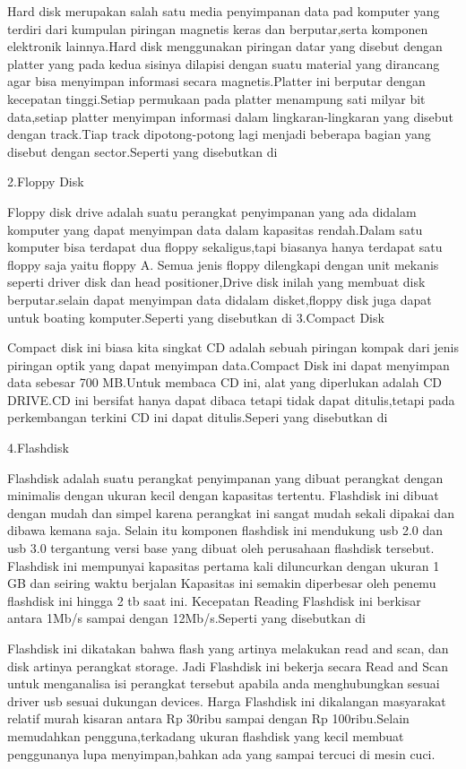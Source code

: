 Hard disk merupakan salah satu media penyimpanan data pad komputer yang terdiri dari kumpulan piringan magnetis keras dan berputar,serta komponen elektronik lainnya.Hard disk menggunakan piringan datar yang disebut dengan platter yang pada kedua sisinya dilapisi dengan suatu material yang dirancang agar bisa menyimpan informasi secara magnetis.Platter ini berputar dengan kecepatan tinggi.Setiap permukaan pada platter menampung sati milyar bit data,setiap platter menyimpan informasi dalam lingkaran-lingkaran yang disebut dengan track.Tiap track dipotong-potong lagi menjadi beberapa bagian yang disebut dengan sector.Seperti yang disebutkan di \cite{wahyudi2005mengenal}

2.Floppy Disk

Floppy disk drive adalah suatu perangkat penyimpanan yang ada didalam komputer yang dapat menyimpan data dalam kapasitas rendah.Dalam satu komputer bisa terdapat dua floppy sekaligus,tapi biasanya hanya terdapat satu floppy saja yaitu floppy A. Semua jenis floppy dilengkapi dengan unit mekanis seperti driver disk dan head positioner,Drive disk inilah yang membuat disk berputar.selain dapat menyimpan data didalam disket,floppy disk juga dapat untuk boating komputer.Seperti yang disebutkan di \cite{horie1987floppy}
3.Compact Disk

Compact disk ini biasa kita singkat CD adalah sebuah piringan kompak dari jenis piringan optik yang dapat menyimpan data.Compact Disk ini dapat menyimpan data sebesar 700 MB.Untuk membaca CD ini, alat yang diperlukan adalah CD DRIVE.CD ini bersifat hanya dapat dibaca tetapi tidak dapat ditulis,tetapi pada perkembangan terkini CD ini dapat ditulis.Seperi yang disebutkan di \cite{ernst1998turtles}

4.Flashdisk

Flashdisk adalah suatu perangkat penyimpanan yang dibuat perangkat dengan minimalis dengan ukuran kecil dengan kapasitas tertentu. Flashdisk ini dibuat dengan
mudah dan simpel karena perangkat ini sangat mudah sekali dipakai dan dibawa kemana saja. Selain itu komponen flashdisk ini mendukung usb 2.0 dan usb 3.0 tergantung
versi base yang dibuat oleh perusahaan flashdisk tersebut. Flashdisk ini mempunyai kapasitas pertama kali diluncurkan dengan ukuran 1 GB dan seiring waktu berjalan
Kapasitas ini semakin diperbesar oleh penemu flashdisk ini hingga 2 tb saat ini. Kecepatan Reading Flashdisk ini berkisar antara 1Mb/s sampai dengan 12Mb/s.Seperti yang disebutkan di \cite{aini2010mengukur}

Flashdisk ini dikatakan bahwa flash yang artinya melakukan read and scan, dan disk artinya perangkat storage. Jadi Flashdisk ini bekerja secara Read and Scan untuk
menganalisa isi perangkat tersebut apabila anda menghubungkan sesuai driver usb sesuai dukungan devices. Harga Flashdisk ini dikalangan masyarakat relatif murah
kisaran antara Rp 30ribu sampai dengan Rp 100ribu.Selain memudahkan pengguna,terkadang ukuran flashdisk yang kecil membuat penggunanya lupa menyimpan,bahkan ada yang sampai tercuci di mesin cuci.

